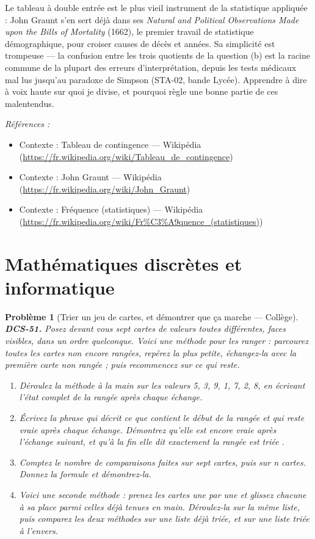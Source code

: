 \documentclass[11pt]{article}
\newtheorem{problem}{Problème}
\newenvironment{refs}{\par\small\noindent\emph{Références :}\begin{itemize}\setlength\itemsep{0pt}}{\end{itemize}\normalsize}
\begin{document}
\noindent Le tableau à double entrée est le plus vieil instrument de la statistique
appliquée : John Graunt s'en sert déjà dans ses \textit{Natural and Political Observations Made upon the
Bills of Mortality} (1662), le premier travail de statistique démographique, pour croiser causes
de décès et années. Sa simplicité est trompeuse --- la confusion entre les trois quotients de la
question (b) est la racine commune de la plupart des erreurs d'interprétation, depuis les tests
médicaux mal lus jusqu'au paradoxe de Simpson (STA-02, bande Lycée). Apprendre à dire à voix haute
\og{} sur quoi je divise, et pourquoi \fg{} règle une bonne partie de ces malentendus.

\begin{refs}
\item Contexte : Tableau de contingence --- Wikipédia (\url{https://fr.wikipedia.org/wiki/Tableau_de_contingence})
\item Contexte : John Graunt --- Wikipédia (\url{https://fr.wikipedia.org/wiki/John_Graunt})
\item Contexte : Fréquence (statistiques) --- Wikipédia (\url{https://fr.wikipedia.org/wiki/Fr%C3%A9quence_(statistiques)})
\end{refs}

\bigskip


\section*{Mathématiques discrètes et informatique}

\begin{problem}[{Trier un jeu de cartes, et démontrer que ça marche --- Collège}]
\textbf{DCS-51.} Posez devant vous sept cartes de valeurs toutes différentes, faces
visibles, dans un ordre quelconque. Voici une méthode pour les ranger : parcourez toutes les
cartes non encore rangées, repérez la plus petite, échangez-la avec la première carte non
rangée ; puis recommencez sur ce qui reste.
\begin{enumerate}
\item[(a)] Déroulez la méthode à la main sur les valeurs 5, 3, 9, 1, 7, 2, 8, en écrivant l'état
complet de la rangée après chaque échange.
\item[(b)] Écrivez la phrase qui décrit ce que contient le début de la rangée et qui reste vraie
après chaque échange. Démontrez qu'elle est encore vraie après l'échange suivant, et qu'à la
fin elle dit exactement \og{} la rangée est triée \fg{}.
\item[(c)] Comptez le nombre de comparaisons faites sur sept cartes, puis sur n cartes. Donnez la
formule et démontrez-la.
\item[(d)] Voici une seconde méthode : prenez les cartes une par une et glissez chacune à sa place
parmi celles déjà tenues en main. Déroulez-la sur la même liste, puis comparez les deux
méthodes sur une liste déjà triée, et sur une liste triée à l'envers.
\end{enumerate}

\end{problem}
\end{document}
